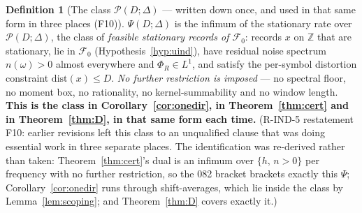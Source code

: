 \documentclass[11pt]{article}
\theoremstyle{definition}
\newtheorem{definition}{Definition}
\theoremstyle{remark}
\begin{document}
\begin{definition}[The class $\mathcal P(D;\Delta)$ --- written down once,
and used in that same form in three places (F10)]
\label{def:psiclass}
$\Psi(D;\Delta)$ is the infimum of the stationary rate over
$\mathcal P(D;\Delta)$, the class of \emph{feasible stationary records of
$\mathcal F_0$}: records $x$ on $\mathbb Z$ that are stationary, lie in
$\mathcal F_0$ (Hypothesis~\ref{hyp:uind}), have residual noise spectrum
$n(\omega)>0$ almost everywhere and $\Phi_R\in L^1$, and satisfy the
per-symbol distortion constraint $\mathrm{dist}(x)\le D$. \emph{No further
restriction is imposed} --- no spectral floor, no moment box, no rationality,
no kernel-summability and no window length.
\textbf{This is the class in Corollary~\ref{cor:onedir}, in
Theorem~\ref{thm:cert} and in Theorem~\ref{thm:D}, in that same form each
time.} (R-IND-5 restatement F10: earlier revisions left this class to an
unqualified clause that was doing essential work in three separate places.
The identification was re-derived rather than taken: Theorem~\ref{thm:cert}'s
dual is an infimum over $\{h,\,n>0\}$ per frequency with no further
restriction, so the 082 bracket brackets exactly this $\Psi$;
Corollary~\ref{cor:onedir} runs through shift-averages, which lie inside the
class by Lemma~\ref{lem:scoping}; and Theorem~\ref{thm:D} covers exactly it.)
\end{definition}
\end{document}
